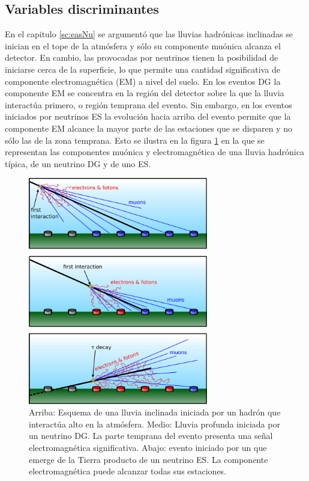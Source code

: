 	\subsection{Variables discriminantes}
	\label{sbsc:discVars}
	
	En el capitulo \ref{sc:easNu} se argumentó que las lluvias hadrónicas inclinadas se inician en el tope de la atmósfera y sólo su componente muónica alcanza el detector.
	En cambio, las provocadas por neutrinos tienen la posibilidad de iniciarse cerca de la superficie, lo que permite una cantidad significativa de componente electromagnética (EM) a nivel del suelo.
	En los eventos DG la componente EM se concentra en la región del detector sobre la que la lluvia interactúa primero, o regi\'on temprana del evento.
	Sin embargo, en los eventos iniciados por neutrinos ES la evolución hacia arriba del evento permite que la componente EM alcance la mayor parte de las estaciones que se disparen y no sólo las de la zona temprana.
	Esto se ilustra en la figura \ref{fig:compNus} en la que se representan las componentes muónica y electromagnética de una lluvia hadrónica típica, de un neutrino DG y de uno ES.
	\begin{figure}[ht!]
		\begin{center}
		\includegraphics[width=0.7\textwidth]{fig/seleccionAuger/inclined_regular_dg_and_up}
		\caption{Arriba: Esquema de una lluvia inclinada iniciada por un hadrón que interactúa alto en la atmósfera. Medio: Lluvia profunda iniciada por un neutrino DG. La parte temprana del evento presenta una señal electromagnética significativa. Abajo: evento iniciado por un \tauon{} que emerge de la Tierra producto de un neutrino ES. La componente electromagnética puede alcanzar todas sus estaciones.}
		\label{fig:compNus}
		\end{center}
	\end{figure}
	
